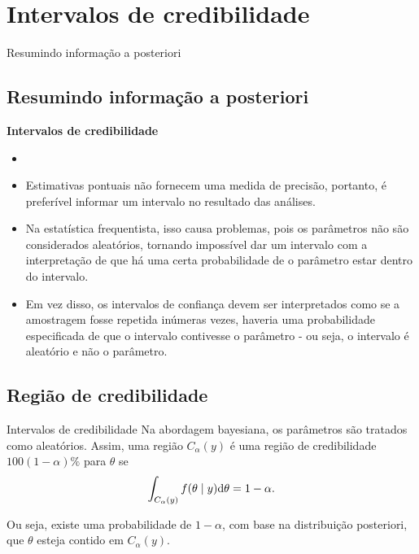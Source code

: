 \documentclass{beamer}
\theoremstyle{definition}
\begin{document}
\section{Intervalos de credibilidade}
\begin{frame}{Resumindo informação a posteriori}
\subsection{Resumindo informação a posteriori}
\textbf{Intervalos de credibilidade}
\begin{itemize}
\item {}
\item Estimativas pontuais não fornecem uma medida de precisão, portanto, é preferível informar um intervalo no resultado das análises.
\item Na estatística frequentista, isso causa problemas, pois os parâmetros não são considerados aleatórios, tornando impossível dar um intervalo com a interpretação de que há uma certa probabilidade de o parâmetro estar dentro do intervalo.
\item Em vez disso, os intervalos de confiança devem ser interpretados como se a amostragem fosse repetida inúmeras vezes, haveria uma probabilidade especificada de que o intervalo contivesse o parâmetro - ou seja, o intervalo é aleatório e não o parâmetro.
\end{itemize}
\end{frame}

\subsection{Região de credibilidade}
\begin{frame}{Intervalos de credibilidade}
Na abordagem bayesiana, os parâmetros são tratados como aleatórios. Assim, uma região $C_\alpha(y)$ é uma região de credibilidade $100(1- \alpha)\%$ para $\theta$ se \\
\begin{equation}
    \int_{C_\alpha(y)} f(\theta \mid y) \mathrm{d} \theta=1-\alpha.
    \vspace{0.8cm}
\end{equation}

Ou seja, existe uma probabilidade de $1- \alpha$, com base na distribuição posteriori, que $\theta$ esteja contido em $C_\alpha(y)$.
\end{frame}
\end{document}

